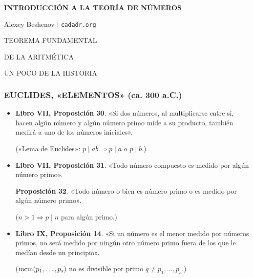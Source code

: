 

\usepackage{cancel}



\begin{frame}
  \textbf{INTRODUCCIÓN A LA TEORÍA DE NÚMEROS}

  Alexey Beshenov $\mid$ \texttt{cadadr.org}

  \vfill

  \begin{center}\huge\headingfont
    TEOREMA FUNDAMENTAL

    DE LA ARITMÉTICA
  \end{center}

  \vfill
\end{frame}

\begin{frame}

  \vfill

  \begin{center}\huge\headingfont
    UN POCO DE LA HISTORIA
  \end{center}

  \vfill
\end{frame}

\begin{frame}
  \frametitle{EUCLIDES, «ELEMENTOS» (ca. 300 a.C.)}

  \begin{itemize}
  \item<2-> \textbf{Libro VII, Proposición 30}. «Si dos números, al
    multiplicarse entre sí, hacen algún número y algún número primo mide a su
    producto, también medirá a uno de los números iniciales».

    («Lema de Euclides»: $p \mid ab \Longrightarrow p\mid a\text{ o } p\mid b$.)

  \item<3-> \textbf{Libro VII, Proposición 31}. «Todo número compuesto es medido
    por algún número primo».

    \textbf{Proposición 32}. «Todo número o bien es número primo o es medido por
    algún número primo».
 
    ($n > 1 \Longrightarrow p \mid n$ para algún primo.)

  \item<4-> \textbf{Libro IX, Proposición 14}. «Si un número es el menor medido
    por números primos, no será medido por ningún otro número primo fuera de los
    que le medían desde un principio».

    ($\operatorname{mcm} (p_1,\ldots,p_s)$ no es divisible por primo $q \ne p_1,\ldots,p_s$.)
  \end{itemize}
\end{frame}


